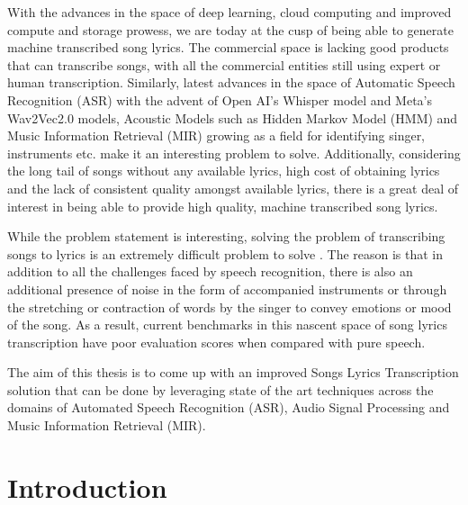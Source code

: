 With the advances in the space of deep learning, cloud computing and improved compute and storage prowess, we are today at the cusp of being able to generate machine transcribed song lyrics. The commercial space is lacking good products that can transcribe songs, with all the commercial entities still using expert or human transcription. Similarly, latest advances in the space of Automatic Speech Recognition (ASR) with the advent of Open AI's Whisper model and Meta's Wav2Vec2.0 models, Acoustic Models such as Hidden Markov Model (HMM) and Music Information Retrieval (MIR) growing as a field for identifying singer, instruments etc. make it an interesting problem to solve. Additionally, considering the long tail of songs without any available lyrics, high cost of obtaining lyrics and the lack of consistent quality amongst available lyrics, there is a great deal of interest in being able to provide high quality, machine transcribed song lyrics. 

While the problem statement is interesting, solving the problem of transcribing songs to lyrics is an extremely difficult problem to solve \cite{gu2022mm} . The reason is that in addition to all the challenges faced by speech recognition, there is also an additional presence of noise in the form of accompanied instruments or through the stretching or contraction of words by the singer to convey emotions or mood of the song. As a result, current benchmarks in this nascent space of song lyrics transcription have poor evaluation scores when compared with pure speech.

The aim of this thesis is to come up with an improved Songs Lyrics Transcription solution that can be done by leveraging  state of the art techniques across the domains of Automated Speech Recognition (ASR), Audio Signal Processing and Music Information Retrieval (MIR).

\section{Introduction}
\label{sec:introduction}

